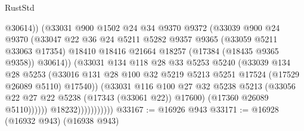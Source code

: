 \begin{lexlean}{RustStd}
\begin{coremodule}
                                  @30614))
                              (@33031
                                @900
                                @1502
                                @24
                                @34
                                @9370
                                @9372
                                (@33039
                                  @900
                                  @24
                                  @9370
                                  (@33047
                                    @22
                                    @36
                                    @24
                                    @5211
                                    @5282
                                    @9357
                                    @9365
                                    (@33059 @5211 @33063 @17354)
                                    @18410
                                    @18416
                                    @21664
                                    @18257
                                    (@17384 (@18435 @9365 @9358))
                                    @30614))
                                (@33031
                                  @134
                                  @118
                                  @28
                                  @33
                                  @5253
                                  @5240
                                  (@33039
                                    @134
                                    @28
                                    @5253
                                    (@33016
                                      @131
                                      @28
                                      @100
                                      @32
                                      @5219
                                      @5213
                                      @5251
                                      @17524
                                      (@17529 @26089 @5110)
                                      @17540))
                                  (@33031
                                    @116
                                    @100
                                    @27
                                    @32
                                    @5238
                                    @5213
                                    (@33056 @22 @27 @22 @5238 (@17343 (@33061 @22)) @17600)
                                    (@17360 @26089 @5110))))))
                          @18232)))))))))))
@33167 := @16926 @943
@33171 := @16928 (@16932 @943) (@16938 @943)

\end{coremodule}
\end{lexlean}
